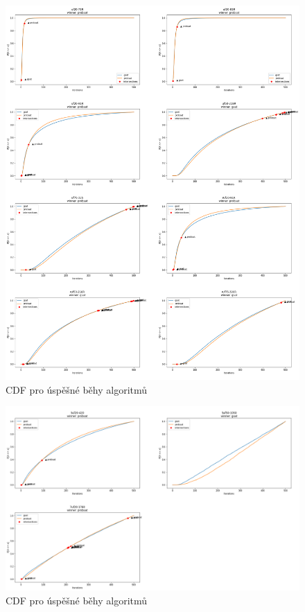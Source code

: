 \documentclass[twoside,twocolumn]{article}
\begin{document}
    \begin{figure}[h]
        \includegraphics[width=\textwidth]{images/gsat_probsat_success_cdf-1}
        \caption{CDF pro úspěšné běhy algoritmů}
        \label{fig:cdf1}
    \end{figure}

    \begin{figure}[h]
        \includegraphics[width=\textwidth]{images/gsat_probsat_success_cdf-2}
        \caption{CDF pro úspěšné běhy algoritmů}
        \label{fig:cdf2}
    \end{figure}
\end{document}
